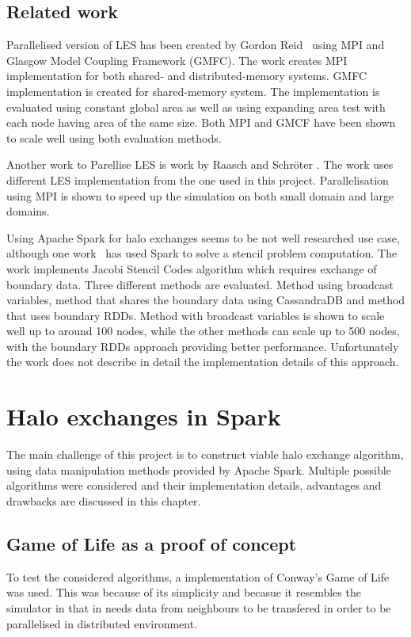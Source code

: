 \documentclass{l4proj}
\begin{document}
\section{Related work}

Parallelised version of LES has been created by Gordon Reid~\cite{les_mpi} using MPI
and Glasgow Model Coupling Framework (GMFC). The work creates MPI implementation for both shared-
and distributed-memory systems. GMFC implementation is created for shared-memory system.
The implementation is evaluated using constant global area as well as using expanding area
test with each node having area of the same size. Both MPI and GMCF have been shown
to scale well using both evaluation methods.

Another work to Parellise LES is work by Raasch and Schröter \cite{les_palm}. The work
uses different LES implementation from the one used in this project. Parallelisation
using MPI is shown to speed up the simulation on both small domain and large domains.

Using Apache Spark for halo exchanges seems to be not well researched use case, although
one work~\cite{seismic_spark} has used Spark to solve a stencil problem computation. 
The work implements Jacobi Stencil Codes algorithm which requires exchange of boundary
data. Three different methods are evaluated. Method using broadcast variables, method
that shares the boundary data using CassandraDB and method that uses boundary RDDs.
Method with broadcast variables is shown to scale well up to around 100 nodes, while
the other methods can scale up to 500 nodes, with the boundary RDDs approach providing
better performance. Unfortunately the work does not describe in detail the implementation
details of this approach.

\chapter{Halo exchanges in Spark}
\label{chap:halos}

The main challenge of this project is to construct viable halo exchange algorithm, using 
data manipulation methods provided by Apache Spark. Multiple possible algorithms were 
considered and their implementation details, advantages and drawbacks are discussed in this chapter.

\section{Game of Life as a proof of concept}
To test the considered algorithms, a implementation of Conway's Game of Life was used.
This was because of its simplicity and becasue it resembles the simulator in that
in needs data from neighbours to be transfered in order to be parallelised in 
distributed environment.
\end{document}
